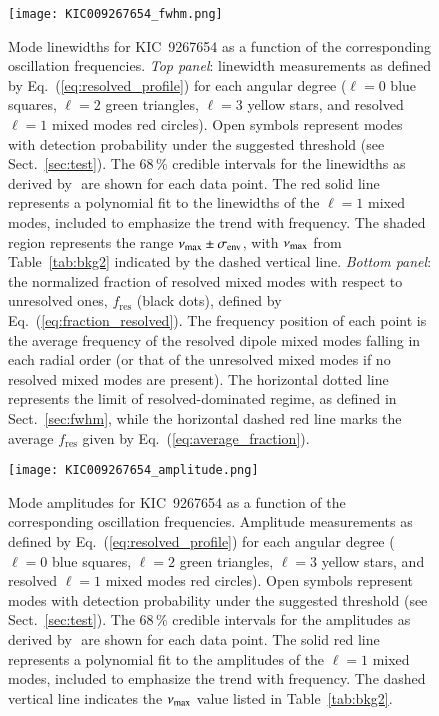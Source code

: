 \begin{figure}
   \centering
   \texttt{[image: KIC009267654\_fwhm.png]}
      \caption{Mode linewidths for KIC~9267654 as a function of the corresponding oscillation frequencies. \textit{Top panel}: linewidth measurements as defined by Eq.~(\ref{eq:resolved_profile}) for each angular degree ($\ell = 0$ blue squares, $\ell = 2$ green triangles, $\ell = 3$ yellow stars, and resolved $\ell = 1$ mixed modes red circles). Open symbols represent modes with detection probability under the suggested threshold (see Sect.~\ref{sec:test}). The 68\,\% credible intervals for the linewidths as derived by \diamonds\,\,are shown for each data point. The red solid line represents a polynomial fit to the linewidths of the $\ell = 1$ mixed modes, included to emphasize the trend with frequency. The shaded region represents the range $\nu_\mathrm{max} \pm \sigma_\mathrm{env}$, with $\nu_\mathrm{max}$ from Table~\ref{tab:bkg2} indicated by the dashed vertical line. \textit{Bottom panel}: the normalized fraction of resolved mixed modes with respect to unresolved ones, $f_\mathrm{res}$ (black dots), defined by Eq.~(\ref{eq:fraction_resolved}). The frequency position of each point is the average frequency of the resolved dipole mixed modes falling in each radial order (or that of the unresolved mixed modes if no resolved mixed modes are present). The horizontal dotted line represents the limit of resolved-dominated regime, as defined in Sect.~\ref{sec:fwhm}, while the horizontal dashed red line marks the average $f_\mathrm{res}$ given by Eq.~(\ref{eq:average_fraction}).}
    \label{fig:9267654fwhm}
\end{figure}

\begin{figure}
   \centering
   \texttt{[image: KIC009267654\_amplitude.png]}
      \caption{Mode amplitudes for KIC~9267654 as a function of the corresponding oscillation frequencies. Amplitude measurements as defined by Eq.~(\ref{eq:resolved_profile}) for each angular degree ($\ell = 0$ blue squares, $\ell = 2$ green triangles, $\ell = 3$ yellow stars, and resolved $\ell = 1$ mixed modes red circles). Open symbols represent modes with detection probability under the suggested threshold (see Sect.~\ref{sec:test}). The 68\,\% credible intervals for the amplitudes as derived by \diamonds\,\,are shown for each data point. The solid red line represents a polynomial fit to the amplitudes of the $\ell = 1$ mixed modes, included to emphasize the trend with frequency. The dashed vertical line indicates the $\nu_\mathrm{max}$ value listed in Table~\ref{tab:bkg2}.}
    \label{fig:9267654amplitude}
\end{figure}
\clearpage


